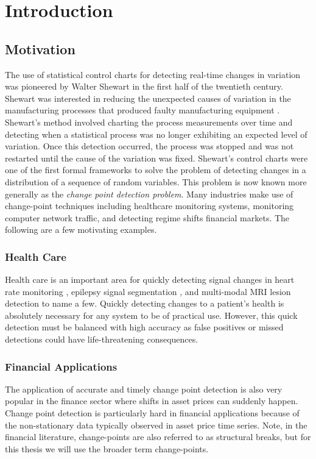 \chapter{Introduction}
\section{Motivation}
The use of statistical control charts for detecting real-time changes in variation was pioneered by Walter Shewart in the first half of the twentieth century.  Shewart was interested in reducing the unexpected causes of variation in the manufacturing processes that produced faulty manufacturing equipment \cite{shewhart1931economic}. Shewart's method involved charting the process measurements over time and detecting when a statistical process was no longer exhibiting an expected level of variation. Once this detection occurred, the process was stopped and was not restarted until the cause of the variation was fixed.
Shewart's control charts were one of the first formal frameworks to solve the problem of detecting changes in a distribution of a sequence of random variables. This problem is now known more generally as the \textit{change point detection problem}. Many industries make use of change-point techniques including healthcare monitoring systems, monitoring computer network traffic, and detecting regime shifts financial markets. The following are a few motivating examples.

\subsection{Health Care}
Health care is an important area for quickly detecting signal changes in heart rate monitoring \cite{yang2006adaptive} \cite{staudacher2005new}, epilepsy signal segmentation \cite{malladi2013online}, and multi-modal MRI lesion detection \cite{bosc2003automatic} to name a few. Quickly detecting changes to a patient's health is absolutely necessary for any system to be of practical use. However, this quick detection must be balanced with high accuracy as false positives or missed detections could have life-threatening consequences.


\subsection{Financial Applications}
The application of accurate and timely change point detection is also very popular in the finance sector where shifts in asset prices can suddenly happen. Change point detection is particularly hard in financial applications because of the non-stationary data typically observed in asset price time series. Note, in the financial literature, change-points  are also referred to as structural breaks, but for this thesis we will use the broader term change-points.

